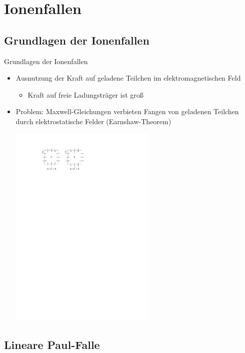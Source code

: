 \documentclass[12pt,xcolor=dvipsnames]{beamer}
\begin{document}
\section{Ionenfallen}

\subsection{Grundlagen der Ionenfallen}
\begin{frame}{Grundlagen der Ionenfallen}
	\begin{itemize}
		\item Ausnutzung der Kraft auf geladene Teilchen im elektromagnetischen Feld
			\begin{itemize}
				\item Kraft auf freie Ladungsträger ist groß
			\end{itemize}
		
		\item \alert{Problem:} Maxwell-Gleichungen verbieten Fangen von geladenen Teilchen durch elektrostatische Felder (Earnshaw-Theorem)
		
		\vspace{0.5cm}
		\centering
		\includegraphics[width=0.55\textwidth]{./figures/earnshaw.pdf}
		
	\end{itemize}
\end{frame}

\subsection{Lineare Paul-Falle}
\end{document}
